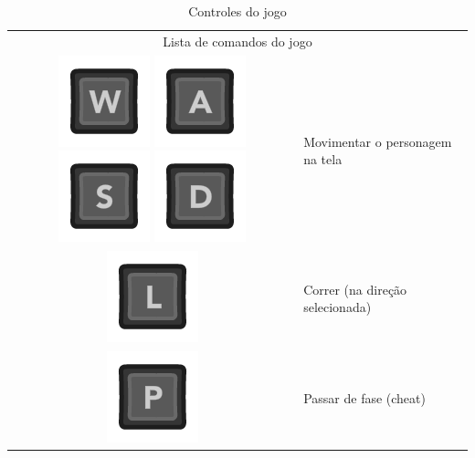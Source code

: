 \begin{longtable}{|c|p{10cm}|}
\caption{Controles do jogo}
\onehalfspacing
\\
\hline
\multicolumn{2}{|c|}{Lista de comandos do jogo}
\\
\hline
\includegraphics[scale=0.3]{images/kW.png} 
\includegraphics[scale=0.3]{images/kA.png}
\includegraphics[scale=0.3]{images/kS.png}
\includegraphics[scale=0.3]{images/kD.png}
& Movimentar o personagem na tela
\\
\hline
\includegraphics[scale=0.3]{images/kL.png}
 & Correr (na direção selecionada)
\\
\hline
\includegraphics[scale=0.3]{images/kP.png}
& Passar de fase (cheat) 
\\

\end{longtable}

